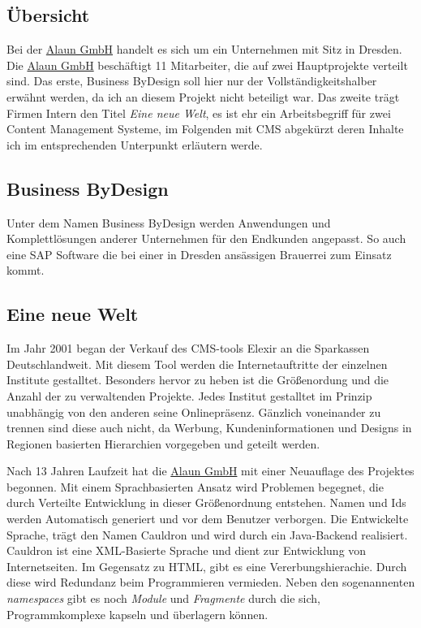 \documentclass[12pt]{article}
\begin{document}
\subsection{Übersicht}

Bei der \href{https://alaun.de/home/}{Alaun GmbH} handelt es sich um ein Unternehmen mit Sitz in Dresden.
Die \href{https://alaun.de/home/}{Alaun GmbH} beschäftigt 11 Mitarbeiter, die auf zwei Hauptprojekte verteilt
sind. Das erste, Business ByDesign soll hier nur der Vollständigkeitshalber erwähnt werden, 
da ich an diesem Projekt nicht beteiligt war. Das zweite trägt Firmen Intern den Titel \textit{Eine neue Welt},
es ist ehr ein Arbeitsbegriff für zwei Content Management Systeme, im Folgenden mit CMS abgekürzt deren Inhalte
ich im entsprechenden Unterpunkt erläutern werde.

\subsection{Business ByDesign}

Unter dem Namen Business ByDesign werden Anwendungen und Komplettlösungen anderer Unternehmen für den
Endkunden angepasst. So auch eine SAP Software die bei einer in Dresden ansässigen Brauerrei zum Einsatz kommt.

\subsection{Eine neue Welt}

Im Jahr 2001 began der Verkauf des CMS-tools Elexir an die Sparkassen Deutschlandweit. Mit diesem Tool werden
die Internetauftritte der einzelnen Institute gestalltet. Besonders hervor zu heben ist die Größenordung und
die Anzahl der zu verwaltenden Projekte. Jedes Institut gestalltet im Prinzip unabhängig von den anderen seine Onlinepräsenz.
Gänzlich voneinander zu trennen sind diese auch nicht, da Werbung, Kundeninformationen und Designs in
Regionen basierten Hierarchien vorgegeben und geteilt werden.

Nach 13 Jahren Laufzeit hat die \href{https://alaun.de/home/}{Alaun GmbH} mit einer Neuauflage des Projektes begonnen.
Mit einem Sprachbasierten Ansatz wird Problemen begegnet, die durch Verteilte Entwicklung in dieser Größenordnung
entstehen. Namen und Ids werden Automatisch generiert und vor dem Benutzer verborgen. 
Die Entwickelte Sprache, trägt den Namen Cauldron und wird durch ein Java-Backend realisiert.
Cauldron ist eine XML-Basierte Sprache und dient zur Entwicklung von Internetseiten.
Im Gegensatz zu HTML, gibt es eine Vererbungshierachie. Durch diese wird Redundanz beim Programmieren vermieden.
Neben den sogenannenten \textit{namespaces} gibt es noch \textit{Module} und \textit{Fragmente} durch die sich,
Programmkomplexe kapseln und überlagern können. 
\end{document}
